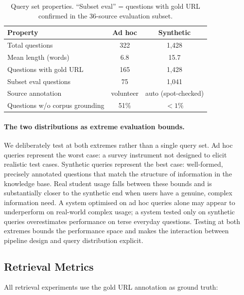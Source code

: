 \documentclass[sigconf,natbib=true]{acmart}
\begin{document}
\begin{table}[h]
\centering
\caption{Query set properties. ``Subset eval'' = questions with gold URL confirmed in the 36-source evaluation subset.}
\label{tab:querysets}
\small
\setlength{\tabcolsep}{4pt}
\begin{tabular}{lcc}
\toprule
\textbf{Property} & \textbf{Ad hoc} & \textbf{Synthetic} \\
\midrule
Total questions & 322 & 1{,}428 \\
Mean length (words) & 6.8 & 15.7 \\
Questions with gold URL & 165 & 1{,}428 \\
Subset eval questions & 75 & 1{,}041 \\
Source annotation & volunteer & auto (spot-checked) \\
Questions w/o corpus grounding & 51\% & ${<}1\%$ \\
\bottomrule
\end{tabular}
\end{table}

\paragraph{The two distributions as extreme evaluation bounds.}
We deliberately test at both extremes rather than a single query set.
Ad hoc queries represent the worst case: a survey instrument not designed to elicit realistic test cases.
Synthetic queries represent the best case: well-formed, precisely annotated questions that match the structure of information in the knowledge base.
Real student usage falls between these bounds and is substantially closer to the synthetic end when users have a genuine, complex information need.
A system optimised on ad hoc queries alone may appear to underperform on real-world complex usage; a system tested only on synthetic queries overestimates performance on terse everyday questions.
Testing at both extremes bounds the performance space and makes the interaction between pipeline design and query distribution explicit.

\subsection{Retrieval Metrics}

All retrieval experiments use the gold URL annotation as ground truth:
\end{document}
